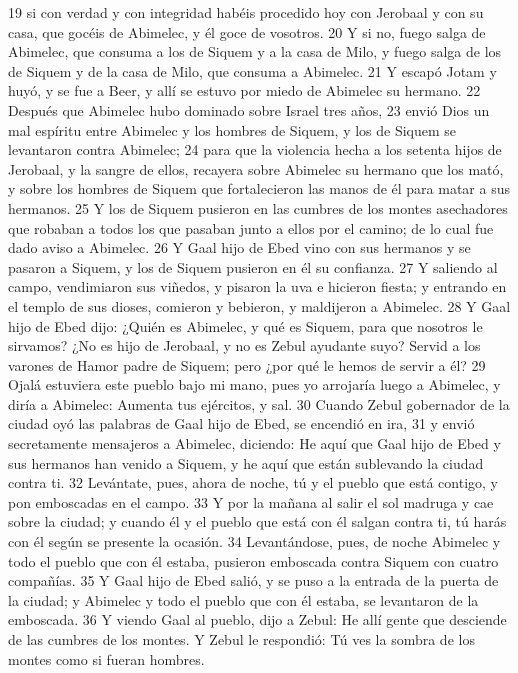 19 si con verdad y con integridad habéis procedido hoy con Jerobaal y con su casa, que gocéis de Abimelec, y él goce de vosotros.
20 Y si no, fuego salga de Abimelec, que consuma a los de Siquem y a la casa de Milo, y fuego salga de los de Siquem y de la casa de Milo, que consuma a Abimelec.
21 Y escapó Jotam y huyó, y se fue a Beer, y allí se estuvo por miedo de Abimelec su hermano.
22 Después que Abimelec hubo dominado sobre Israel tres años,
23 envió Dios un mal espíritu entre Abimelec y los hombres de Siquem, y los de Siquem se levantaron contra Abimelec;
24 para que la violencia hecha a los setenta hijos de Jerobaal, y la sangre de ellos, recayera sobre Abimelec su hermano que los mató, y sobre los hombres de Siquem que fortalecieron las manos de él para matar a sus hermanos.
25 Y los de Siquem pusieron en las cumbres de los montes asechadores que robaban a todos los que pasaban junto a ellos por el camino; de lo cual fue dado aviso a Abimelec.
26 Y Gaal hijo de Ebed vino con sus hermanos y se pasaron a Siquem, y los de Siquem pusieron en él su confianza.
27 Y saliendo al campo, vendimiaron sus viñedos, y pisaron la uva e hicieron fiesta; y entrando en el templo de sus dioses, comieron y bebieron, y maldijeron a Abimelec.
28 Y Gaal hijo de Ebed dijo: ¿Quién es Abimelec, y qué es Siquem, para que nosotros le sirvamos? ¿No es hijo de Jerobaal, y no es Zebul ayudante suyo? Servid a los varones de Hamor padre de Siquem; pero ¿por qué le hemos de servir a él?
29 Ojalá estuviera este pueblo bajo mi mano, pues yo arrojaría luego a Abimelec, y diría a Abimelec: Aumenta tus ejércitos, y sal.
30 Cuando Zebul gobernador de la ciudad oyó las palabras de Gaal hijo de Ebed, se encendió en ira,
31 y envió secretamente mensajeros a Abimelec, diciendo: He aquí que Gaal hijo de Ebed y sus hermanos han venido a Siquem, y he aquí que están sublevando la ciudad contra ti.
32 Levántate, pues, ahora de noche, tú y el pueblo que está contigo, y pon emboscadas en el campo.
33 Y por la mañana al salir el sol madruga y cae sobre la ciudad; y cuando él y el pueblo que está con él salgan contra ti, tú harás con él según se presente la ocasión.
34 Levantándose, pues, de noche Abimelec y todo el pueblo que con él estaba, pusieron emboscada contra Siquem con cuatro compañías.
35 Y Gaal hijo de Ebed salió, y se puso a la entrada de la puerta de la ciudad; y Abimelec y todo el pueblo que con él estaba, se levantaron de la emboscada. 
36 Y viendo Gaal al pueblo, dijo a Zebul: He allí gente que desciende de las cumbres de los montes. Y Zebul le respondió: Tú ves la sombra de los montes como si fueran hombres.

